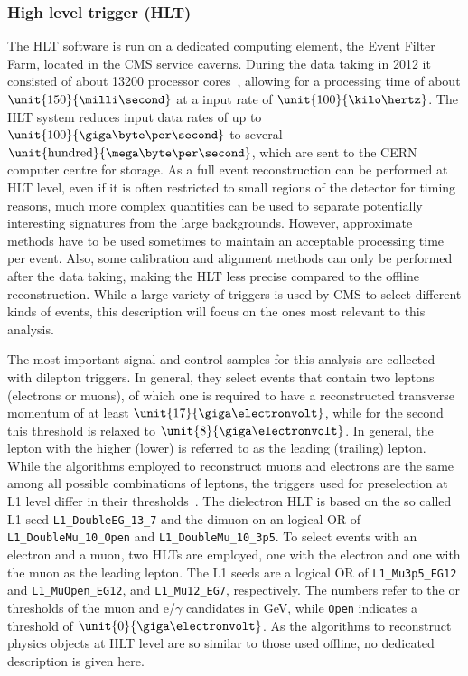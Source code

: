 \subsubsection*{High level trigger (HLT)}
The HLT software is run on a dedicated computing element, the Event Filter Farm, located in the CMS service caverns. During the data taking in 2012 it consisted of about 13200 processor cores~\cite{HLTProceedings}, allowing for a processing time of about $\unit{150}{\milli\second}$ at a input rate of $\unit{100}{\kilo\hertz}$. The HLT system reduces input data rates of up to $\unit{100}{\giga\byte\per\second}$ to several $\unit{\text{hundred}}{\mega\byte\per\second}$, which are sent to the CERN computer centre for storage. As a full event reconstruction can be performed at HLT level, even if it is often restricted to small regions of the detector for timing reasons, much more complex quantities can be used to separate potentially interesting signatures from the large backgrounds. However, approximate methods have to be used sometimes to maintain an acceptable processing time per event. Also, some calibration and alignment methods can only be performed after the data taking, making the HLT less precise compared to the offline reconstruction. While a large variety of triggers is used by CMS to select different kinds of events, this description will focus on the ones most relevant to this analysis. 

The most important signal and control samples for this analysis are collected with dilepton triggers. In general, they select events that contain two leptons (electrons or muons), of which one is required to have a reconstructed transverse momentum \pt of at least $\unit{17}{\giga\electronvolt}$, while for the second this threshold is relaxed to $\unit{8}{\giga\electronvolt}$. In general, the lepton with the higher (lower) \pt is referred to as the leading (trailing) lepton. While the algorithms employed to reconstruct muons and electrons are the same among all possible combinations of leptons, the triggers used for preselection at L1 level differ in their thresholds~\cite{HLTConfigBrowser}. The dielectron HLT is based on the so called L1 seed \verb+L1_DoubleEG_13_7+ and the dimuon on an logical OR of \verb+	L1_DoubleMu_10_Open+ and \verb+L1_DoubleMu_10_3p5+. To select events with an electron and a muon, two HLTs are employed, one with the electron and one with the muon as the leading lepton. The L1 seeds are a logical OR of \verb+L1_Mu3p5_EG12+ and \verb+L1_MuOpen_EG12+, and \verb+L1_Mu12_EG7+, respectively. The numbers refer to the \pt or \Et thresholds of the muon and e/$\gamma$ candidates in GeV, while \verb+Open+ indicates a threshold of $\unit{0}{\giga\electronvolt}$. As the algorithms to reconstruct physics objects at HLT level are so similar to those used offline, no dedicated description is given here.

